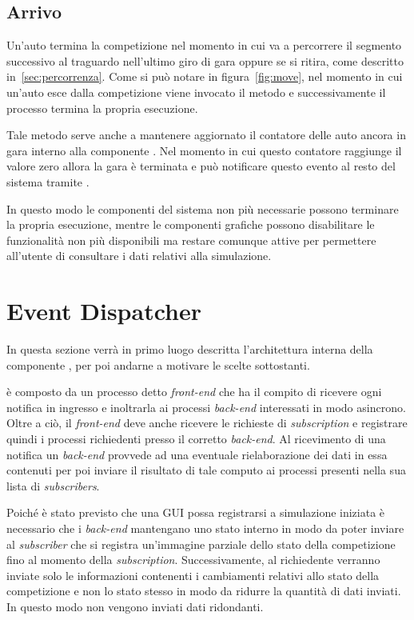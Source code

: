 \subsection{Arrivo}
Un'auto termina la competizione nel momento in cui va a percorrere il segmento successivo al traguardo nell'ultimo giro di gara oppure se si ritira, come descritto in~\ref{sec:percorrenza}. Come si può notare in figura~\ref{fig:move}, nel momento in cui un'auto esce dalla competizione viene invocato il metodo  e successivamente il processo termina la propria esecuzione.

Tale metodo serve anche a mantenere aggiornato il contatore delle auto ancora in gara interno alla componente \track{}. Nel momento in cui questo contatore raggiunge il valore zero allora la gara è terminata e \track{} può notificare questo evento al resto del sistema tramite \evdisp{}.

In questo modo le componenti del sistema non più necessarie possono terminare la propria esecuzione, mentre le componenti grafiche possono disabilitare le funzionalità non più disponibili ma restare comunque attive per permettere all'utente di consultare i dati relativi alla simulazione.

\section{Event Dispatcher}
\label{sec:dispatcherImpl}
In questa sezione verrà in primo luogo descritta l'architettura interna della componente \evdisp{}, per poi andarne a motivare le scelte sottostanti.

\evdisp{} è composto da un processo detto \textit{front-end} che ha il compito di ricevere ogni notifica in ingresso e inoltrarla ai processi \textit{back-end} interessati in modo asincrono. Oltre a ciò, il \textit{front-end} deve anche ricevere le richieste di \textit{subscription} e registrare quindi i processi richiedenti presso il corretto \textit{back-end}. Al ricevimento di una notifica un \textit{back-end} provvede ad una eventuale rielaborazione dei dati in essa contenuti per poi inviare il risultato di tale computo ai processi presenti nella sua lista di \textit{subscribers}.

Poiché è stato previsto che una GUI possa registrarsi a simulazione iniziata è necessario che i \textit{back-end} mantengano uno stato interno in modo da poter inviare al \textit{subscriber} che si registra un'immagine parziale dello stato della competizione fino al momento della \textit{subscription}. Successivamente, al richiedente verranno inviate solo le informazioni contenenti i cambiamenti relativi allo stato della competizione e non lo stato stesso in modo da ridurre la quantità di dati inviati. In questo modo non vengono inviati dati ridondanti.

